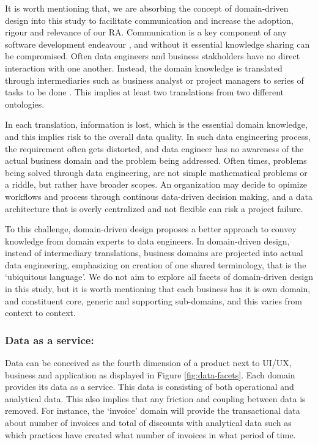 \documentclass[review]{elsarticle}
\begin{document}
It is worth mentioning that, we are absorbing the concept of domain-driven design into this study to facilitate communication and increase the adoption, rigour and relevance of our RA. Communication is a key component of any software development endeavour \cite{sudhakar2012model}, and without it essential knowledge sharing can be compromised. Often data engineers and business stakholders have no direct interaction with one another. Instead, the domain knowledge is translated through intermediaries such as business analyst or project managers to series of tasks to be done \cite{khononov2021learning}. This implies at least two translations from two different ontologies. 

In each translation, information is lost, which is the essential domain knowledge, and this implies risk to the overall data quality. In such data engineering process, the requirement often gets distorted, and data engineer has no awareness of the actual business domain and the problem being addressed. Often times, problems being solved through data engineering, are not simple mathematical problems or a riddle, but rather have broader scopes. An organization may decide to opimize workflows and process through continous data-driven decision making, and a data architecture that is overly centralized and not flexible can risk a project failure. 

To this challenge, domain-driven design proposes a better approach to convey knowledge from domain experts to data engineers. In domain-driven design, instead of intermediary translations, business domains are projected into actual data engineering, emphasizing on creation of one shared terminology, that is the `ubiquitous language'. We do not aim to explore all facets of domain-driven design in this study, but it is  worth mentioning that each business has it is  own domain, and constituent core, generic and supporting sub-domains, and this varies from context to context.

\subsubsection{Data as a service:}

Data can be conceived as the fourth dimension of a product next to UI/UX, business and application as displayed in Figure \ref{fig:data-facets}. Each domain provides its data as a service. This data is consisting of both operational and analytical data. This also implies that any friction and coupling between data is removed. For instance, the `invoice' domain will provide the transactional data about number of invoices and total of discounts with analytical data such as which practices have created what number of invoices in what period of time.
\end{document}

